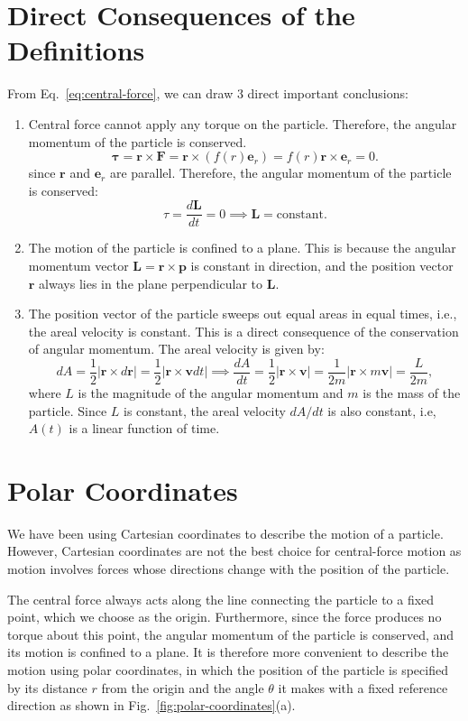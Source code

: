 \documentclass[12pt]{article}
\begin{document}
\section{\label{sec:direct-consequences}Direct Consequences of the Definitions}
From Eq.~\ref{eq:central-force}, we can draw $3$ direct important conclusions:

\begin{enumerate}
    \item[(i)] Central force cannot apply any torque on the particle. Therefore, the angular momentum of the particle is conserved.
    \[
    \mathbf{\tau} = \mathbf{r} \times \mathbf{F} = \mathbf{r} \times (f(r)\mathbf{e}_r) = f(r) \mathbf{r} \times \mathbf{e}_r = 0.
    \]
    since $\mathbf{r}$ and $\mathbf{e}_r$ are parallel. Therefore, the angular momentum of the particle is conserved:
    \[
    \tau = \frac{d\mathbf{L}}{dt} = 0 \implies \mathbf{L} = \text{constant}.
    \]
    \item[(ii)] The motion of the particle is confined to a plane. This is because the angular momentum vector $\mathbf{L} = \mathbf{r} \times \mathbf{p}$ is constant in direction, and the position vector $\mathbf{r}$ always lies in the plane perpendicular to $\mathbf{L}$.
    \item[(iii)] The position vector of the particle sweeps out equal areas in equal times, i.e., the areal velocity is constant. This is a direct consequence of the conservation of angular momentum. The areal velocity is given by:
    \[
    dA= \frac{1}{2}|\mathbf{r} \times d\mathbf{r}| = \frac{1}{2}|\mathbf{r} \times \mathbf{v}dt| \implies \frac{dA}{dt} = \frac{1}{2}|\mathbf{r} \times \mathbf{v}| = \frac{1}{2m}|\mathbf{r} \times m\mathbf{v}| =\frac{L}{2m},
    \]
    where $L$ is the magnitude of the angular momentum and $m$ is the mass of the particle. Since $L$ is constant, the areal velocity $dA/dt$ is also constant, i.e, $A(t)$ is a linear function of time. 
\end{enumerate}

\section{Polar Coordinates}

We have been using Cartesian coordinates to describe the motion of a particle. However, Cartesian coordinates are not the best choice for central-force motion as motion involves forces whose directions change with the position of the particle.

The central force always acts along the line connecting the particle to a fixed point, which we choose as the origin. Furthermore, since the force produces no torque about this point, the angular momentum of the particle is conserved, and its motion is confined to a plane. It is therefore more convenient to describe the motion using polar coordinates, in which the position of the particle is specified by its distance $r$ from the origin and the angle $\theta$ it makes with a fixed reference direction as shown in Fig.~\ref{fig:polar-coordinates}(a). 
\end{document}
